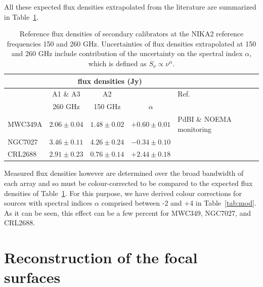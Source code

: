 \documentclass[traditionalabstract]{aa}
\begin{document}
\begin{appendix}
All these expected flux densities extrapolated from the literature are
summarized in Table~\ref{tab:flux_ref_sec}.

\begin{table}[!thbp]
  \caption[Reference flux densities of secondary calibrators]{Reference flux densities of secondary calibrators at the NIKA2 reference frequencies 150 and 260 GHz. Uncertainties of flux densities extrapolated
    at 150 and 260 GHz include contribution of the uncertainty on the spectral index $\alpha$, which is defined as $S_{\nu} \propto \nu^{\alpha}$.}
  \label{tab:flux_ref_sec}
  \centering    
  \begin{tabular}{|l|c|c|c|l|}
    \hline\hline
    \multicolumn{1}{|c}{}  & \multicolumn{3}{|c}{flux  densities (Jy)} & \multicolumn{1}{|c|}{}  \\
    \hline
    &    A1 \& A3       &  A2             &            &   Ref. \\
    &  260 GHz          &  150 GHz        & $\alpha$ &      \\
    \hline
    MWC349A   &   $2.06\pm0.04$  &  $1.48\pm0.02$ &  $+0.60\pm0.01$      &  PdBI \& NOEMA monitoring  \\
    NGC7027  &   $3.46\pm0.11$   &  $4.26\pm0.24$  &  $-0.34\pm0.10$     &  \citet{Hoare1992}      \\
    CRL2688  &   $2.91\pm0.23$   &  $0.76\pm0.14$  &  $+2.44\pm0.18$     &  \citet{Dempsey2013_SCUBA2} \\
    \hline
  \end{tabular}
\end{table}

Measured flux densities however are determined over the broad
bandwidth of each array and so must be colour-corrected to be compared
to the expected flux densities of Table~\ref{tab:flux_ref_sec}.  For
this purpose, we have derived colour corrections for sources with spectral
indices $\alpha$ comprised between -2 and +4 in Table~\ref{tab:mod}. %
As it can be seen, this effect can be a few percent for MWC349, NGC7027, and CRL2688.


  \section{Reconstruction of the focal surfaces}
  \label{ap:focus_surfaces}


\end{appendix}
\end{document}
